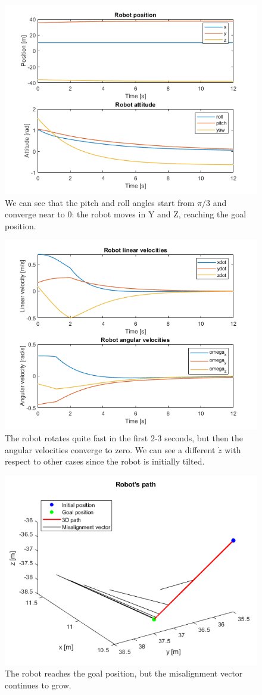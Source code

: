 \documentclass{article}
\begin{document}
\begin{figure}[H]
	\centering
	\includegraphics[width=0.7\linewidth]{images/Ex1/HorAtt_Enabled_DifferentStartpos_DifferentEndpos_PosAndAtt}
	\caption{We can see that the pitch and roll angles start from $ \pi/3 $ and converge near to 0: the robot moves in Y and Z, reaching the goal position.}
	\label{fig:q2case3a}
\end{figure}
\begin{figure}[H]
	\centering
	\includegraphics[width=0.7\linewidth]{images/Ex1/HorAtt_Enabled_DifferentStartpos_DifferentEndpos_LinAngVelocities}
	\caption{The robot rotates quite fast in the first 2-3 seconds, but then the angular velocities converge to zero. We can see a different $\dot{z}$ with respect to other cases since the robot is initially tilted.}
	\label{fig:q2case3b}
\end{figure}
\begin{figure}[H]
	\centering
	\includegraphics[width=0.7\linewidth]{images/Ex1/HorAtt_Enabled_DifferentStartpos_DifferentEndpos_Path}
	\caption{The robot reaches the goal position, but the misalignment vector continues to grow.}
	\label{fig:q2case3c}
\end{figure}
\end{document}
